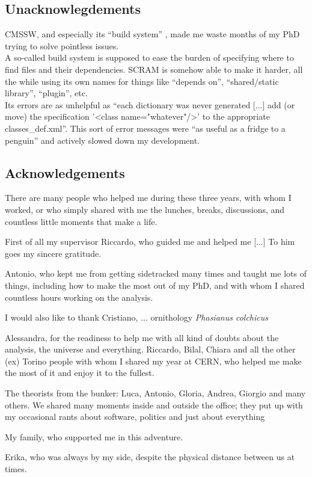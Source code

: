 \subsection{Unacknowlegdements}
CMSSW, and especially its ``build system'' , made me waste months of my PhD trying to solve pointless issues.\\
A so-called build system is supposed to ease the burden of specifying where to find files and their dependencies.
SCRAM is somehow able to make it harder, all the while using its own names for things like ``depends on'', ``shared/static library'', ``plugin'', etc.\\
Its errors are as unhelpful as ``each dictionary was never generated [...] add (or move) the specification '<class name="whatever"/>' to the appropriate classes_def.xml''.
This sort of error messages were ``as useful as a fridge to a penguin'' and actively slowed down my development.

\subsection{Acknowledgements}
There are many people who helped me during these three years, with whom I worked, or who simply shared with me the lunches, breaks, discussions, and countless little moments that make a life.

First of all my supervisor Riccardo, who guided me and helped me [...]
To him goes my sincere gratitude.

Antonio, who kept me from getting sidetracked many times and taught me lots of things, including how to make the most out of my PhD, and with whom I shared countless hours working on the analysis.

I would also like to thank Cristiano, ...
ornithology
\textit{Phasianus colchicus}

Alessandra, for the readiness to help me with all kind of doubts about the analysis, the universe and everything.
Riccardo, Bilal, Chiara and all the other (ex) Torino people with whom I shared my year at CERN, who helped me make the most of it and enjoy it to the fullest.

The theorists from the bunker: Luca, Antonio, Gloria, Andrea, Giorgio and many others.
We shared many moments inside and outside the office;
they put up with my occasional rants about software, politics and just about everything


My family, who supported me in this adventure.

Erika, who was always by my side, despite the physical distance between us at times.
